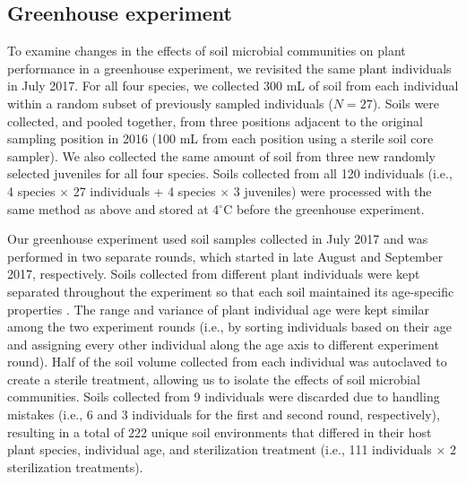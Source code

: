 \subsection*{Greenhouse experiment}
To examine changes in the effects of soil microbial communities on plant performance in a greenhouse experiment, we revisited the same plant individuals in July 2017. 
For all four species, we collected 300 mL of soil from each individual within a random subset of previously sampled individuals ($N = 27$). Soils were collected, and pooled together, from three positions adjacent to the original sampling position in 2016 (100 mL from each position using a sterile soil core sampler). We also collected the same amount of soil from three new randomly selected juveniles for all four species. 
Soils collected from all 120 individuals (i.e., 4 species $\times$ 27 individuals + 4 species $\times$ 3 juveniles) were processed with the same method as above and stored at 4$^{\circ}$C before the greenhouse experiment.
\par


Our greenhouse experiment used soil samples collected in July 2017 and was performed in two separate rounds, which started in late August and September 2017, respectively.
Soils collected from different plant individuals were kept separated throughout the experiment so that each soil maintained its age-specific properties \citep{Rinella2018}.
The range and variance of plant individual age were kept similar among the two experiment rounds (i.e., by sorting individuals based on their age and assigning every other individual along the age axis to different experiment round). 
Half of the soil volume collected from each individual was autoclaved to create a sterile treatment, allowing us to isolate the effects of soil microbial communities. 
Soils collected from 9 individuals were discarded due to handling mistakes (i.e., 6 and 3 individuals for the first and second round, respectively), resulting in a total of 222 unique soil environments that differed in their host plant species, individual age, and sterilization treatment (i.e., 111 individuals $\times$ 2 sterilization treatments).
\par


